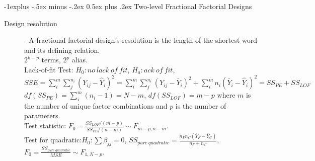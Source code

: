 \documentclass[10pt,landscape]{article}
\makeatletter
\renewcommand{\subsection}{\@startsection{subsection}{2}{0mm}%
                                {-1explus -.5ex minus -.2ex}%
                                {0.5ex plus .2ex}%
                                {\normalfont\normalsize\bfseries}}
\makeatother
\begin{document}
\begin{multicols}{3}
\subsection{Two-level Fractional Factorial Designs}
\begin{description}
\item[Design resolution]- A fractional factorial design's resolution is the length of the shortest word and its defining relation. \\
$2^{k-p}$ terms, $2^p$ alias.\\
Lack-of-fit Test: $H_0: no\ lack\ of\ fit$, $H_a: ack\ of\ fit$, $SSE = \sum_i^m \sum_j^{n_i} (Y_{ij} - \hat{Y}_i)^2 = \sum_i^m \sum_j^{n_i} (Y_{ij} - \bar{Y}_i)^2 + \sum_i^m n_i(\bar{Y}_i - \hat{Y}_i)^2 = SS_{PE} + SS_{LOF}$\\
$df(SS_{PE}) = \sum_i^m (n_i - 1) = N-m$, $df(SS_{LOF}) = m-p$  where $m$ is the number of unique factor combinations and $p$ is the number of parameters. \\
Test statistic: $F_0 = \frac{SS_{LOF} / (m-p)}{SS_{PE} / (n-m)} \sim F_{m-p, n-m}$.\\
Test for quadratic:$H_0: \sum	\beta_{jj} = 0$, $SS_{pure\ quadratic} = \frac{n_Fn_C (\bar{Y}_F - \bar{Y}_C)}{n_F+n_C}$, $F_0 = \frac{SS_{pure\ quadratic}}{MSE} \sim F_{1, N-p}$.
\end{description}



\end{multicols}
\end{document}
